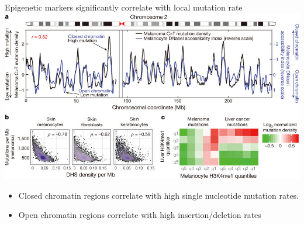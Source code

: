 \documentclass{beamer}
\begin{document}
\begin{frame}{Epigenetic markers significantly correlate with local mutation rate}
\includegraphics[width=\linewidth,trim={0 7.5cm 0 0},clip]{polak_2015_chromatin.jpg}
\begin{itemize}
\item Closed chromatin regions correlate with high single nucleotide mutation rates. 
\item Open chromatin regions correlate with high insertion/deletion rates \parencite{makova_effects_2015}
\end{itemize}
\end{frame}


\end{document}

